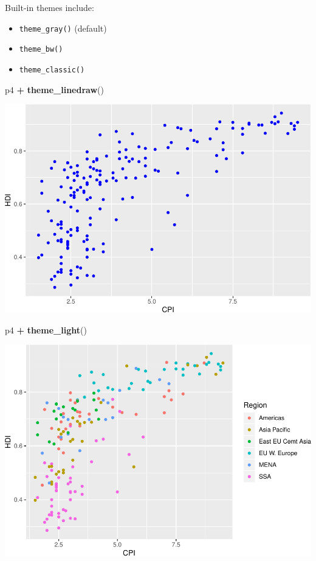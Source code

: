 \documentclass[
]{book}
\newenvironment{Shaded}{\begin{snugshade}}{\end{snugshade}}
\newcommand{\KeywordTok}[1]{\textcolor[rgb]{0.13,0.29,0.53}{\textbf{#1}}}
\newcommand{\NormalTok}[1]{#1}
\newcommand{\OperatorTok}[1]{\textcolor[rgb]{0.81,0.36,0.00}{\textbf{#1}}}
\newcommand{\StringTok}[1]{\textcolor[rgb]{0.31,0.60,0.02}{#1}}
\providecommand{\tightlist}{%
  \setlength{\itemsep}{0pt}\setlength{\parskip}{0pt}}
\begin{document}
Built-in themes include:

\begin{itemize}
\tightlist
\item
  \texttt{theme\_gray()} (default)
\item
  \texttt{theme\_bw()}
\item
  \texttt{theme\_classic()}
\end{itemize}

\begin{Shaded}
\begin{Highlighting}[]
\NormalTok{p4 }\OperatorTok{+}\StringTok{ }\KeywordTok{theme\_linedraw}\NormalTok{()}
\end{Highlighting}
\end{Shaded}

\includegraphics{R/Rgraphics/figures/unnamed-chunk-195-1.pdf}

\begin{Shaded}
\begin{Highlighting}[]
\NormalTok{p4 }\OperatorTok{+}\StringTok{ }\KeywordTok{theme\_light}\NormalTok{()}
\end{Highlighting}
\end{Shaded}

\includegraphics{R/Rgraphics/figures/unnamed-chunk-196-1.pdf}
\end{document}
